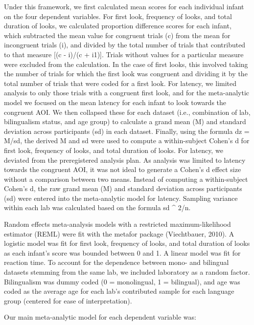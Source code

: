 \documentclass[,man,floatsintext]{apa6}
\begin{document}
Under this framework, we first calculated mean scores for each individual infant on the four dependent variables. For first look, frequency of looks, and total duration of looks, we calculated proportion difference scores for each infant, which subtracted the mean value for congruent trials (c) from the mean for incongruent trials (i), and divided by the total number of trials that contributed to that measure {[}(c - i)/(c + i1){]}. Trials without values for a particular measure were excluded from the calculation. In the case of first looks, this involved taking the number of trials for which the first look was congruent and dividing it by the total number of trials that were coded for a first look. For latency, we limited analysis to only those trials with a congruent first look, and for the meta-analytic model we focused on the mean latency for each infant to look towards the congruent AOI. We then collapsed these for each dataset (i.e., combination of lab, bilingualism status, and age group) to calculate a grand mean (M) and standard deviation across participants (sd) in each dataset. Finally, using the formula dz = M/sd, the derived M and sd were used to compute a within-subject Cohen's d for first look, frequency of looks, and total duration of looks. For latency, we deviated from the preregistered analysis plan. As analysis was limited to latency towards the congruent AOI, it was not ideal to generate a Cohen's d effect size without a comparison between two means. Instead of computing a within-subject Cohen's d, the raw grand mean (M) and standard deviation across participants (sd) were entered into the meta-analytic model for latency. Sampling variance within each lab was calculated based on the formula sd \^{} 2/n.

Random effects meta-analysis models with a restricted maximum-likelihood estimator (REML) were fit with the metafor package (Viechtbauer, 2010). A logistic model was fit for first look, frequency of looks, and total duration of looks as each infant's score was bounded between 0 and 1. A linear model was fit for reaction time. To account for the dependence between mono- and bilingual datasets stemming from the same lab, we included laboratory as a random factor. Bilingualism was dummy coded (0 = monolingual, 1 = bilingual), and age was coded as the average age for each lab's contributed sample for each language group (centered for ease of interpretation).

Our main meta-analytic model for each dependent variable was:
\end{document}

